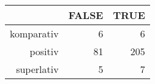 \begin{tabular}{rrr}
  \hline
 & FALSE & TRUE \\ 
  \hline
komparativ & 6 & 6 \\ 
  positiv & 81 & 205 \\ 
  superlativ & 5 & 7 \\ 
   \hline
\end{tabular}
